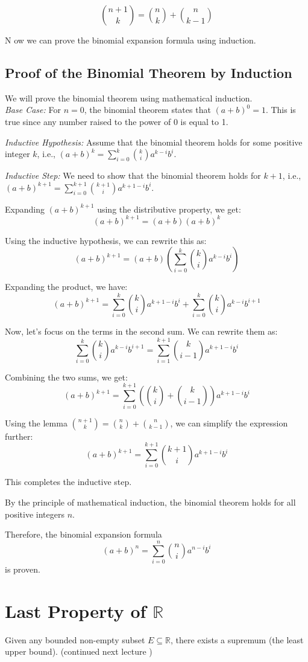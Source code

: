 \documentclass{article}
\begin{document}
\begin{lemma}
    $$\binom{n+1}{k} = \binom{n}{k} + \binom{n}{k-1}$$
\end{lemma}
N ow we can prove the binomial expansion formula using induction.
\subsection{Proof of the Binomial Theorem by Induction}
\begin{proofbox}
We will prove the binomial theorem using mathematical induction. \\ 
\textit{Base Case:} For $n = 0$, the binomial theorem states that $(a + b)^0 = 1$. This is true since any number raised to the power of 0 is equal to 1.

\textit{Inductive Hypothesis:} Assume that the binomial theorem holds for some positive integer $k$, i.e., $(a + b)^k = \sum_{i=0}^{k} \binom{k}{i} a^{k-i} b^i$.

\textit{Inductive Step:} We need to show that the binomial theorem holds for $k+1$, i.e., $(a + b)^{k+1} = \sum_{i=0}^{k+1} \binom{k+1}{i} a^{k+1-i} b^i$.

Expanding $(a + b)^{k+1}$ using the distributive property, we get:
$$(a + b)^{k+1} = (a + b)(a + b)^k$$

Using the inductive hypothesis, we can rewrite this as:
$$(a + b)^{k+1} = (a + b) \left(\sum_{i=0}^{k} \binom{k}{i} a^{k-i} b^i\right)$$

Expanding the product, we have:
$$(a + b)^{k+1} = \sum_{i=0}^{k} \binom{k}{i} a^{k+1-i} b^i + \sum_{i=0}^{k} \binom{k}{i} a^{k-i} b^{i+1}$$

Now, let's focus on the terms in the second sum. We can rewrite them as:
$$\sum_{i=0}^{k} \binom{k}{i} a^{k-i} b^{i+1} = \sum_{i=1}^{k+1} \binom{k}{i-1} a^{k+1-i} b^i$$

Combining the two sums, we get:
$$(a + b)^{k+1} = \sum_{i=0}^{k+1} \left(\binom{k}{i} + \binom{k}{i-1}\right) a^{k+1-i} b^i$$

Using the lemma $\binom{n+1}{k} = \binom{n}{k} + \binom{n}{k-1}$, we can simplify the expression further:
$$(a + b)^{k+1} = \sum_{i=0}^{k+1} \binom{k+1}{i} a^{k+1-i} b^i$$

This completes the inductive step.

By the principle of mathematical induction, the binomial theorem holds for all positive integers $n$.

Therefore, the binomial expansion formula $$(a + b)^n = \sum_{i = 0}^{n} \binom{n}{i}a^{n-i} b^{i}$$ is proven.
\end{proofbox}

\section{Last Property of $\mathbb{R}$}
Given any bounded non-empty subset $E \subseteq \mathbb{R}$, there exists a supremum (the least upper bound). (continued next lecture )
\end{document}
